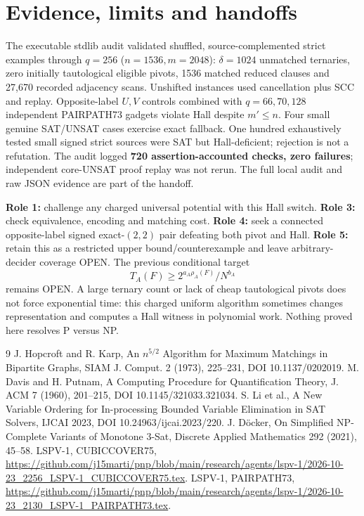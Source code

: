 \documentclass[11pt]{article}
\begin{document}
\section{Evidence, limits and handoffs}
The executable stdlib audit validated shuffled, source-complemented strict examples through $q=256$ ($n=1536,m=2048$): $\delta=1024$ unmatched ternaries, zero initially tautological eligible pivots, 1536 matched reduced clauses and 27,670 recorded adjacency scans. Unshifted instances used cancellation plus SCC and replay. Opposite-label $U,V$ controls combined with $q=66,70,128$ independent PAIRPATH73 gadgets violate Hall despite $m'\le n$. Four small genuine SAT/UNSAT cases exercise exact fallback. One hundred exhaustively tested small signed strict sources were SAT but Hall-deficient; rejection is not a refutation. The audit logged \textbf{720 assertion-accounted checks, zero failures}; independent core-UNSAT proof replay was not rerun. The full local audit and raw JSON evidence are part of the handoff.
\par\noindent\textbf{Role 1:} challenge any charged universal potential with this Hall switch. \textbf{Role 3:} check equivalence, encoding and matching cost. \textbf{Role 4:} seek a connected opposite-label signed exact-$(2,2)$ pair defeating both pivot and Hall. \textbf{Role 5:} retain this as a restricted upper bound/counterexample and leave arbitrary-decider coverage OPEN.
The previous conditional target
\[
T_A(F)\ge 2^{a_A\rho_A(F)}/N^{b_A}
\]
remains OPEN. A large ternary count or lack of cheap tautological pivots does not force exponential time: this charged uniform algorithm sometimes changes representation and computes a Hall witness in polynomial work. Nothing proved here resolves P versus NP.
\begin{thebibliography}{9}
 J. Hopcroft and R. Karp, An $n^{5/2}$ Algorithm for Maximum Matchings in Bipartite Graphs, SIAM J. Comput. 2 (1973), 225--231, DOI 10.1137/0202019.
 M. Davis and H. Putnam, A Computing Procedure for Quantification Theory, J. ACM 7 (1960), 201--215, DOI 10.1145/321033.321034.
 S. Li et al., A New Variable Ordering for In-processing Bounded Variable Elimination in SAT Solvers, IJCAI 2023, DOI 10.24963/ijcai.2023/220.
 J. D\"ocker, On Simplified NP-Complete Variants of Monotone 3-Sat, Discrete Applied Mathematics 292 (2021), 45--58.
 LSPV-1, CUBICCOVER75, \url{https://github.com/j15marti/pnp/blob/main/research/agents/lspv-1/2026-10-23_2256_LSPV-1_CUBICCOVER75.tex}.
 LSPV-1, PAIRPATH73, \url{https://github.com/j15marti/pnp/blob/main/research/agents/lspv-1/2026-10-23_2130_LSPV-1_PAIRPATH73.tex}.
\end{thebibliography}
\end{document}
